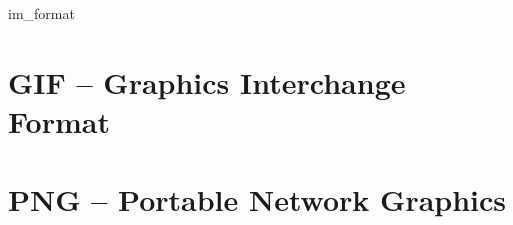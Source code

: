 \documentclass[a4paper]{report}
\begin{document}


\tableofcontents
\listoffigures
\listoftables
\listofalgorithms

\setlength{\parskip}{1ex plus 0.5ex minus 0.2ex}
\setlength{\parindent}{0pt}


 {im_format}




\chapter{GIF -- Graphics Interchange Format}
\chapter{PNG -- Portable Network Graphics}

\printindex


\end{document}
